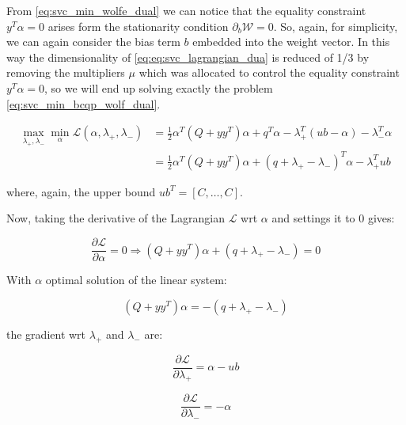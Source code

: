 From \ref{eq:svc_min_wolfe_dual} we can notice that the equality constraint $y^T \alpha = 0$ arises form the stationarity condition $\partial_{{b}} \mathcal{W}=0$. So, again, for simplicity, we can again consider the bias term $b$ embedded into the weight vector. In this way the dimensionality of \ref{eq:eq:svc_lagrangian_dua} is reduced of 1/3 by removing the multipliers $\mu$ which was allocated to control the equality constraint $y^T \alpha=0$, so we will end up solving exactly the problem \ref{eq:svc_min_bcqp_wolf_dual}.

\begin{equation} \label{eq:svc_bcqp_lagrangian_dual}
	\begin{aligned}
    	\max_{\lambda_+,\lambda_-} \min_{\alpha} \mathcal{L}(\alpha,\lambda_+,\lambda_-) &= \frac{1}{2} \alpha^T (Q + yy^T)\alpha+q^T\alpha - \lambda_+^T (ub - \alpha) - \lambda_-^T \alpha \\
    &= \frac{1}{2} \alpha^T (Q + yy^T)\alpha + (q + \lambda_+ - \lambda_-)^T \alpha - \lambda_+^T ub
	\end{aligned}
\end{equation}

where, again, the upper bound $ub^T = [C, \dots, C]$.

Now, taking the derivative of the Lagrangian $\mathcal{L}$ wrt $\alpha$ and settings it to 0 gives:

\begin{equation} \label{eq:svc_bcqp_lagrangian_der_a}
	\frac{\partial \mathcal{L}}{\partial \alpha}=0\Rightarrow (Q + yy^T) \alpha + (q + \lambda_+ - \lambda_-) = 0
\end{equation}

With $\alpha$ optimal solution of the linear system:

\begin{equation} \label{eq:svc_bcqp_lagrangian_sol}
    (Q + yy^T) \alpha = - (q + \lambda_+ - \lambda_-)
\end{equation}

the gradient wrt $\lambda_+$ and $\lambda_-$ are:

\begin{equation} \label{eq:svc_bcqp_lagrangian_der_lp}
	\frac{\partial \mathcal{L}}{\partial \lambda_+}=\alpha - ub
\end{equation}

\begin{equation} \label{eq:svc_bcqp_lagrangian_der_lm}
    \frac{\partial \mathcal{L}}{\partial \lambda_-}=-\alpha
\end{equation}
